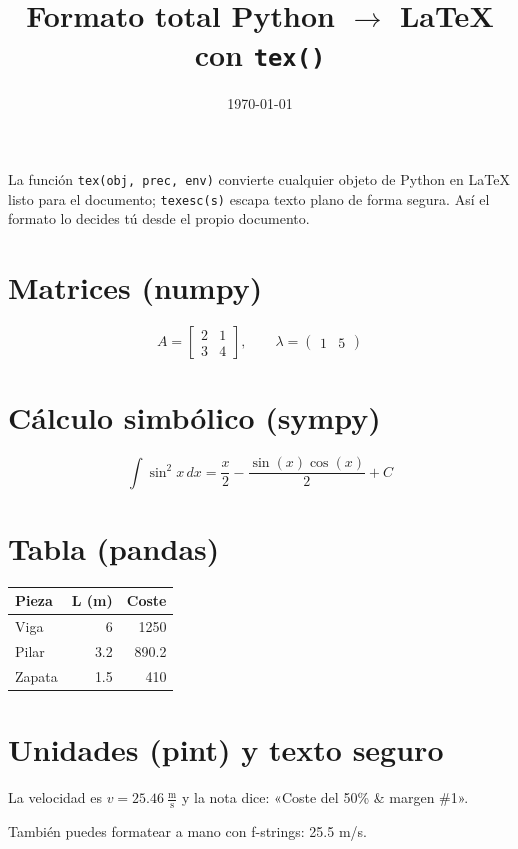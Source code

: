 \documentclass[11pt]{article}
\title{Formato total Python $\to$ \LaTeX{} con \texttt{tex()}}
\author{}
\date{\today}
\begin{document}
\maketitle

La función \verb|tex(obj, prec, env)| convierte cualquier objeto de Python en
\LaTeX{} listo para el documento; \verb|texesc(s)| escapa texto plano de forma
segura. Así el formato lo decides tú desde el propio documento.

%
%
%
%

\section{Matrices (numpy)}
\[ A = \begin{bmatrix} 2 & 1 \\ 3 & 4 \end{bmatrix} , \qquad
   \lambda = \begin{pmatrix} 1 & 5 \end{pmatrix} \]

\section{Cálculo simbólico (sympy)}
\[ \int \sin^2 x \, dx = \frac{x}{2} - \frac{\sin{\left(x \right)} \cos{\left(x \right)}}{2} + C \]

\section{Tabla (pandas)}
\begin{center}
\begin{tabular}{lrr}
\toprule
Pieza & L (m) & Coste \\
\midrule
Viga & 6 & 1250 \\
Pilar & 3.2 & 890.2 \\
Zapata & 1.5 & 410 \\
\bottomrule
\end{tabular}

\end{center}

\section{Unidades (pint) y texto seguro}
La velocidad es $v = 25.46\ \frac{\mathrm{m}}{\mathrm{s}}$ y la nota dice:
«Coste del 50\% \& margen \#1».

También puedes formatear a mano con f-strings: 25.5 m/s.
\end{document}
